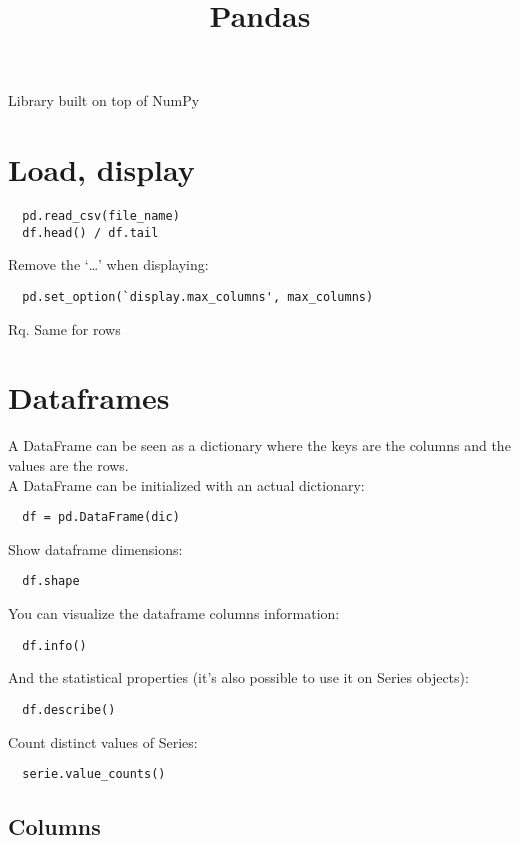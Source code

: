 \documentclass[french]{article}
\title{Pandas}
\begin{document}
\date{}

\maketitle

\setlength{\parindent}{0cm}

Library built on top of NumPy

\section{Load, display}

\begin{verbatim}
  pd.read_csv(file_name)
  df.head() / df.tail
\end{verbatim}

Remove the `\ldots' when displaying:
\begin{verbatim}
  pd.set_option(`display.max_columns', max_columns)
\end{verbatim}
Rq. Same for rows

\section{Dataframes}

A DataFrame can be seen as a dictionary where the keys are the columns and the values are the rows.\\
A DataFrame can be initialized with an actual dictionary:
\begin{verbatim}
  df = pd.DataFrame(dic)
\end{verbatim}

Show dataframe dimensions:
\begin{verbatim}
  df.shape
\end{verbatim}

You can visualize the dataframe columns information:
\begin{verbatim}
  df.info()
\end{verbatim}

And the statistical properties (it's also possible to use it on Series objects): 
\begin{verbatim}
  df.describe()
\end{verbatim}


Count distinct values of Series:
\begin{verbatim}
  serie.value_counts()
\end{verbatim}

\subsection{Columns}
\end{document}
